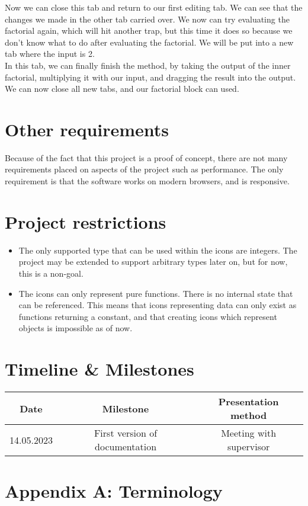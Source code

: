 \documentclass{article}
\begin{document}
        Now we can close this tab and return to our first editing tab. We can see that the changes we made in the other
        tab carried over. We now can try evaluating the factorial again, which will hit another trap, but this time it
        does so because we don't know what to do after evaluating the factorial. We will be put into a new tab where
        the input is 2.\\

        In this tab, we can finally finish the method, by taking the output of the inner factorial, multiplying it with
        our input, and dragging the result into the output. We can now close all new tabs, and our factorial block can
        used.\\

    \section{Other requirements}
        Because of the fact that this project is a proof of concept, there are not many requirements placed
        on aspects of the project such as performance. The only requirement is that the software works on modern
        browsers, and is responsive.

    \section{Project restrictions}
        \begin{itemize}

            \item
                The only supported type that can be used within the icons are integers. The project may be extended
                to support arbitrary types later on, but for now, this is a non-goal.

            \item
                The icons can only represent pure functions. There is no internal state that can be referenced. This
                means that icons representing data can only exist as functions returning a constant, and that creating
                icons which represent objects is impossible as of now.

        \end{itemize}


    \section{Timeline \& Milestones}
        \begin{tabular}{ | c | c | c | }
            \hline
            Date & Milestone & Presentation method\\
            \hline

            14.05.2023 & First version of documentation & Meeting with supervisor \\


            \hline

        \end{tabular}



    \section*{Appendix A: Terminology}
\end{document}
